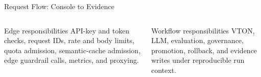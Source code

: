 \documentclass[aspectratio=169,10pt]{beamer}
\newcommand{\source}[1]{%
}
\begin{document}
\begin{frame}{Request Flow: Console to Evidence}
  \vspace{0.25cm}
  \begin{columns}[T,totalwidth=\textwidth]
    \begin{block}{Edge responsibilities}
      API-key and token checks, request IDs, rate and body limits, quota admission, semantic-cache admission, edge guardrail calls, metrics, and proxying.
    \end{block}
    \begin{exampleblock}{Workflow responsibilities}
      VTON, LLM, evaluation, governance, promotion, rollback, and evidence writes under reproducible run context.
    \end{exampleblock}
  \end{columns}
  \source{\texttt{README.md}; \texttt{docs/api\_contract.md}; \texttt{docs/opentelemetry\_tracing.md}.}
\end{frame}
\end{document}
